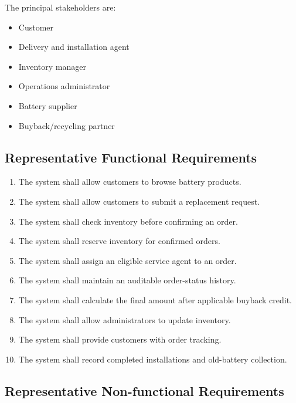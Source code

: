 \documentclass[11pt,a4paper]{article}
\begin{document}
The principal stakeholders are:

\begin{itemize}[leftmargin=0.7cm]
    \item Customer
    \item Delivery and installation agent
    \item Inventory manager
    \item Operations administrator
    \item Battery supplier
    \item Buyback/recycling partner
\end{itemize}

\subsection{Representative Functional Requirements}

\begin{enumerate}[leftmargin=0.7cm]
    \item The system shall allow customers to browse battery products.
    \item The system shall allow customers to submit a replacement request.
    \item The system shall check inventory before confirming an order.
    \item The system shall reserve inventory for confirmed orders.
    \item The system shall assign an eligible service agent to an order.
    \item The system shall maintain an auditable order-status history.
    \item The system shall calculate the final amount after applicable buyback
    credit.
    \item The system shall allow administrators to update inventory.
    \item The system shall provide customers with order tracking.
    \item The system shall record completed installations and old-battery
    collection.
\end{enumerate}

\subsection{Representative Non-functional Requirements}
\end{document}
